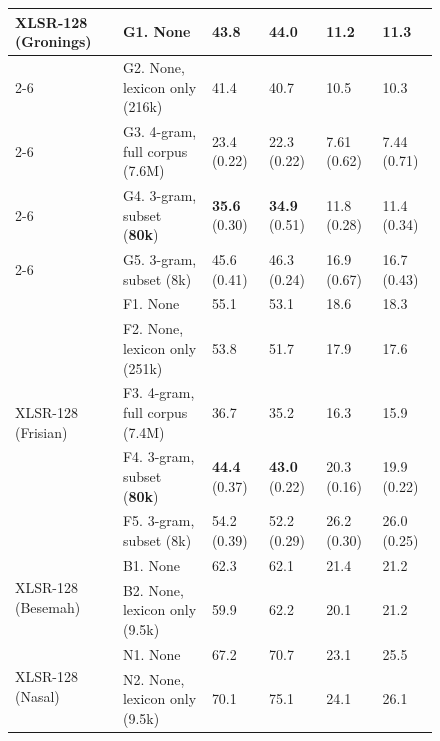 \documentclass[main.tex]{subfiles}
\begin{document}
\begin{figure}[!t]
{\begin{tabular}{llllll}
\multirow{5}{*}[-1em]{XLSR-128 (Gronings)}
& G1. None                                   & 43.8 & 44.0 & 11.2 & 11.3 \\ \cmidrule{2-6}
& G2. None, lexicon only (216k)          & 41.4 & 40.7 & 10.5 & 10.3 \\ \cmidrule{2-6}
& G3. 4-gram, full corpus (7.6M)              & 23.4 (0.22) & 22.3 (0.22) & 7.61 (0.62) & 7.44 (0.71) \\ \cmidrule{2-6}
& G4. 3-gram, subset (\textbf{80k})                 & \textbf{35.6} (0.30) & \textbf{34.9} (0.51) & 11.8 (0.28) & 11.4 (0.34)	 \\ \cmidrule{2-6}
& G5. 3-gram, subset (8k)                & 45.6 (0.41) & 46.3 (0.24) & 16.9 (0.67) & 16.7 (0.43) \\ \midrule

\multirow{5}{*}[-1em]{XLSR-128 (Frisian)}
& F1. None                                     & 55.1 & 53.1 & 18.6 & 18.3 \\ \cmidrule{2-6}
& F2. None, lexicon only (251k)                & 53.8 & 51.7 & 17.9 & 17.6 \\ \cmidrule{2-6}
& F3. 4-gram, full corpus (7.4M)               & 36.7 & 35.2 & 16.3 & 15.9 \\ \cmidrule{2-6}
& F4. 3-gram, subset (\textbf{80k})            & \textbf{44.4} (0.37) & \textbf{43.0} (0.22) & 20.3 (0.16) & 19.9 (0.22) \\ \cmidrule{2-6}
& F5. 3-gram, subset (8k)                 & 54.2 (0.39) & 52.2 (0.29) & 26.2 (0.30) & 26.0 (0.25) \\ \midrule

\multirow{2}{*}{XLSR-128 (Besemah)}
& B1. None                                & 62.3 & 62.1 & 21.4 & 21.2 \\       \cmidrule{2-6}
& B2. None, lexicon only (9.5k)           & 59.9 & 62.2 & 20.1 & 21.2 \\ \midrule

\multirow{2}{*}{XLSR-128 (Nasal)} & N1. None                  & 67.2 & 70.7 & 23.1 & 25.5 \\ \cmidrule{2-6}
& N2. None, lexicon only (9.5k)            & 70.1 & 75.1 & 24.1 & 26.1 \\ 
\bottomrule


\end{tabular}}
\end{figure}
\end{document}
